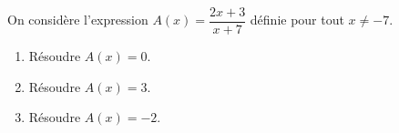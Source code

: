 \begin{exo}{}
	On considère l'expression $A(x) = \dfrac{2x + 3}{x + 7}$ définie pour tout $x \neq -7$.
	\begin{enumerate}
		\item Résoudre $A(x) = 0$.
		\item Résoudre $A(x) = 3$.
		\item Résoudre $A(x) = -2$.
	\end{enumerate}
\end{exo}

